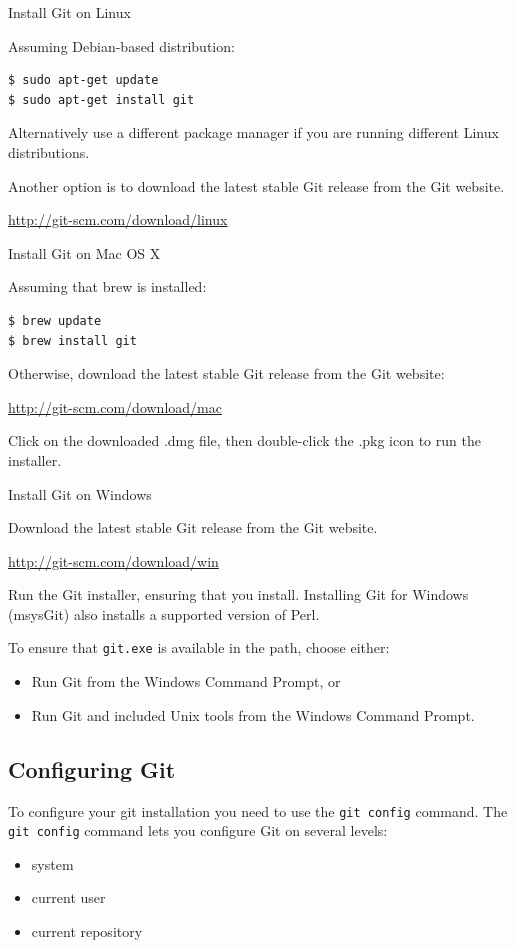 \documentclass{article}
\begin{document}
\begin{description}
\item Install Git on Linux

Assuming Debian-based distribution:
\begin{lstlisting}
$ sudo apt-get update
$ sudo apt-get install git
\end{lstlisting}
Alternatively use a different package manager if you are running
different Linux distributions.

Another option is to download the latest stable Git release from the
Git website.

\url{http://git-scm.com/download/linux}

\item Install Git on Mac OS X

Assuming that brew is installed:
\begin{lstlisting}
$ brew update
$ brew install git
\end{lstlisting}
Otherwise, download the latest stable Git release from the Git
website:

\url{http://git-scm.com/download/mac} 

Click on the downloaded .dmg file, then double-click the .pkg icon to
run the installer.


\item Install Git on Windows

Download the latest stable Git release from the Git website.

\url{http://git-scm.com/download/win} 

Run the Git installer, ensuring that you install. Installing Git for
Windows (msysGit) also installs a supported version of Perl.  

To ensure that \texttt{git.exe} is available in the path, choose
either:
\begin{itemize}
\item Run Git from the Windows Command Prompt, or 
\item Run Git and included Unix tools from the Windows Command
  Prompt.
\end{itemize}

\end{description}

\subsection{Configuring Git}
To configure your git installation you need to use the \texttt{git
  config} command. The \texttt{git config} command lets you configure
Git on several levels:
\begin{itemize}
\item system 
\item current user
\item current repository
\end{itemize}
\end{document}
